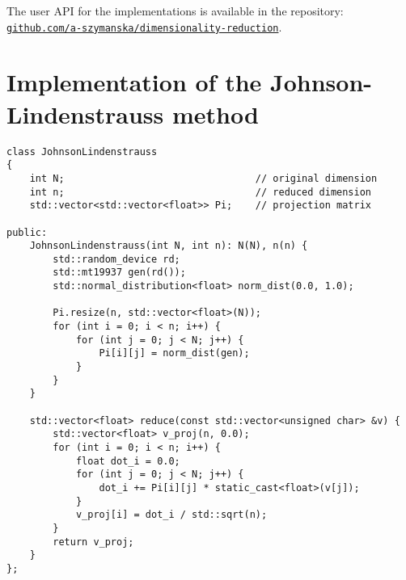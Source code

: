 \vspace{2em}
The user API for the implementations is available in the repository: \\
\href{https://github.com/a-szymanska/dimensionality-reduction}{\texttt{github.com/a-szymanska/dimensionality-reduction}}.

\section{Implementation of the Johnson-Lindenstrauss method}
\begin{lstlisting}[label=lst:JL_code]
class JohnsonLindenstrauss
{
    int N;                                 // original dimension
    int n;                                 // reduced dimension
    std::vector<std::vector<float>> Pi;    // projection matrix

public:
    JohnsonLindenstrauss(int N, int n): N(N), n(n) {
        std::random_device rd;
        std::mt19937 gen(rd());
        std::normal_distribution<float> norm_dist(0.0, 1.0);

        Pi.resize(n, std::vector<float>(N));
        for (int i = 0; i < n; i++) {
            for (int j = 0; j < N; j++) {
                Pi[i][j] = norm_dist(gen);
            }
        }
    }

    std::vector<float> reduce(const std::vector<unsigned char> &v) {
        std::vector<float> v_proj(n, 0.0);
        for (int i = 0; i < n; i++) {
            float dot_i = 0.0;
            for (int j = 0; j < N; j++) {
                dot_i += Pi[i][j] * static_cast<float>(v[j]);
            }
            v_proj[i] = dot_i / std::sqrt(n);
        }
        return v_proj;
    }
};
\end{lstlisting}

\newpage

